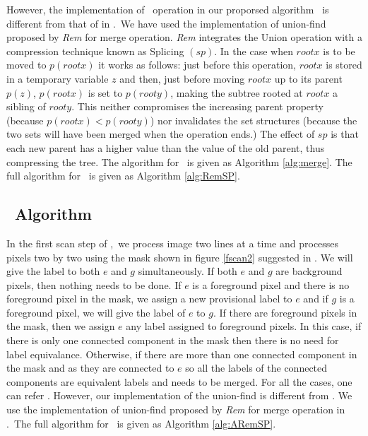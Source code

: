 However, the implementation of \merge\ operation in our proporsed algorithm
\remsp\ is different from that of in \lrpc.\
We have used the implementation of union-find proposed by {\em Rem}
\cite{Patwary2010_RemSP} for merge operation. {\em Rem} integrates the Union
operation with a compression technique known as Splicing $(sp)$. In the case when 
$rootx$ is to be moved to $p(rootx)$ it works as follows: just before this operation, 
$rootx$ is stored in a temporary variable $z$ and 
then, just before moving $rootx$ up to its parent $p(z)$, $p(rootx)$ is set to $p(rooty)$, 
making the subtree rooted at 
$rootx$ a sibling of $rooty$. This neither compromises the increasing parent property (because $p(rootx) < p(rooty)$) 
nor invalidates the set structures (because the two sets will have been merged when the operation ends.) The effect of $sp$
is that each new parent has a higher value than the value of the old parent, thus compressing the tree. The algorithm for
\merge\ is given as Algorithm \ref{alg:merge}. The full algorithm for \remsp\ is
given as Algorithm \ref{alg:RemSP}.
% 


\subsection{\aremsp\ Algorithm}


In the first scan step of \aremsp,\ we process image two lines at a time and processes
pixels two by two using the mask shown in figure \ref{fscan2} suggested in \cite{He2012_ARun}. 
We will give the label to both $e$ and $g$ simultaneously. If both $e$ and $g$ are background pixels,
then nothing needs to be done. If $e$ is a foreground pixel and there is no foreground pixel in the mask, we assign a 
new provisional label to $e$ and if $g$ is a foreground pixel, we will give the
label of $e$ to $g$. If there are foreground pixels in the mask, then we assign $e$ any label assigned to 
foreground pixels. In this case, if there is only one connected component in the mask then there is 
no need for label equivalance. Otherwise, if there are more than one connected component in the mask and as 
they are connected to $e$ so all the labels of the connected components are
equivalent labels and needs to be merged. For all the cases, one can refer \cite{He2012_ARun}.
However, our implementation of the union-find is different from \cite{He2012_ARun}.
We use the implementation of union-find proposed by {\em Rem} \cite{Patwary2010_RemSP} for merge operation in
\aremsp.\ The full algorithm for \aremsp\ is given as Algorithm
\ref{alg:ARemSP}.


% 





 
